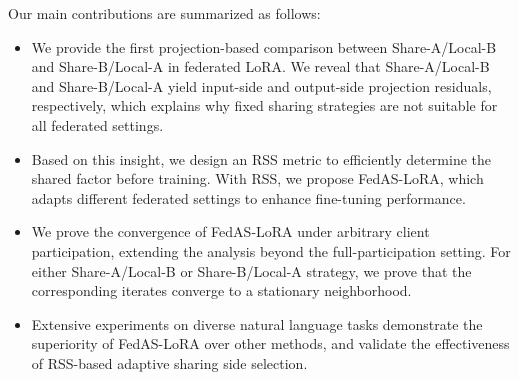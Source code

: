 \documentclass[lettersize,journal]{IEEEtran}
\begin{document}
	Our main contributions are summarized as follows:
	\begin{itemize}
		\item 
		We provide the first projection-based comparison between Share-A/Local-B and Share-B/Local-A in federated LoRA.
		We reveal that Share-A/Local-B and Share-B/Local-A yield input-side and output-side projection residuals, respectively, which explains why fixed sharing strategies are not suitable for all federated settings.
		
		\item Based on this insight, we design an RSS metric to efficiently determine the shared factor before training. With RSS, we propose FedAS-LoRA, which adapts different federated settings to enhance fine-tuning performance.
		
		\item We prove the convergence of FedAS-LoRA under arbitrary client participation, extending the analysis beyond the full-participation setting.
		For either Share-A/Local-B or Share-B/Local-A strategy, we prove that the corresponding iterates converge to a stationary neighborhood.
		
		\item  Extensive experiments on diverse natural language tasks demonstrate the superiority of FedAS-LoRA over other methods, and validate the effectiveness of RSS-based adaptive sharing side selection.
	\end{itemize}
	
\end{document}
